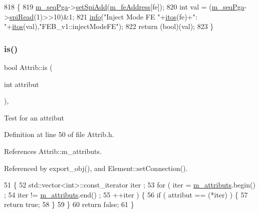 \begin{DoxyCode}
818                                  \{
819   \hyperlink{classFEB__v1_a6c7804ac86796f233a8393043adf2e77}{m\_seqPga}->\hyperlink{classSeqPGA_ac998ce3a6d9b5f2e88cc8393f8c1df53}{setSpiAdd}(\hyperlink{classFEB__v1_a4e1945c2d5b434125f375e9d0fc6d99f}{m\_feAddress}[fe]);
820   \textcolor{keywordtype}{int} val = (\hyperlink{classFEB__v1_a6c7804ac86796f233a8393043adf2e77}{m\_seqPga}->\hyperlink{classSeqPGA_ab3d0e5e5d4014bc7a92588a76b8713d4}{spiRead}(1)>>10)&1;
821   \hyperlink{classObject_a644fd329ea4cb85f54fa6846484b84a8}{info}(\textcolor{stringliteral}{"Inject Mode FE "}+\hyperlink{Tools_8h_af330027dbdafb9a30768b3613c553e60}{itos}(fe)+\textcolor{stringliteral}{": "}+\hyperlink{Tools_8h_af330027dbdafb9a30768b3613c553e60}{itos}(val),\textcolor{stringliteral}{"FEB\_v1::injectModeFE"});
822   \textcolor{keywordflow}{return} (\textcolor{keywordtype}{bool})(val);
823 \}
\end{DoxyCode}
\mbox{\label{classAttrib_a704f26af560909ad22065083bb7d4c34}} 
\subsubsection{\texorpdfstring{is()}{is()}}
{\footnotesize\ttfamily bool Attrib\+::is (\begin{DoxyParamCaption}\item[{int}]{attribut }\end{DoxyParamCaption})\hspace{0.3cm}{\ttfamily [inline]}, {\ttfamily [inherited]}}

Test for an attribut 

Definition at line 50 of file Attrib.\+h.



References Attrib\+::m\+\_\+attributs.



Referenced by export\+\_\+obj(), and Element\+::set\+Connection().


\begin{DoxyCode}
51   \{
52     std::vector<int>::const\_iterator iter ;
53     \textcolor{keywordflow}{for} ( iter  = \hyperlink{classAttrib_ac4bd58a0cc6b38a3b711d609a3d3aacc}{m\_attributs}.begin() ;
54           iter != \hyperlink{classAttrib_ac4bd58a0cc6b38a3b711d609a3d3aacc}{m\_attributs}.end()   ;
55           ++iter ) \{
56       \textcolor{keywordflow}{if} ( attribut == (*iter) ) \{
57         \textcolor{keywordflow}{return} \textcolor{keyword}{true};
58       \}
59     \}
60     \textcolor{keywordflow}{return} \textcolor{keyword}{false};
61   \}
\end{DoxyCode}
\mbox{\label{classFEB__v1_a68050d232efd8d6568910b09a2c18f62}} 
